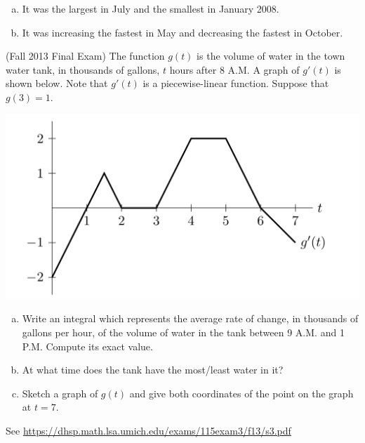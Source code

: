 \documentclass[11pt]{exam}
\begin{document}
\begin{questions}
\begin{solution}
\begin{enumerate}[(a)]
    \item It was the largest in July and the smallest in January 2008.
    \item It was increasing the fastest in May and decreasing the
      fastest in October.
    \end{enumerate}
  \end{solution}
\question (Fall 2013 Final Exam) %
The function $g(t)$ is the volume of water in the town water tank, in thousands of gallons, $t$ hours after 8 A.M. A graph of $g'(t)$ is shown below. Note that $g'(t)$ is a piecewise-linear function. Suppose that $g(3) = 1$.

\begin{minipage}{0.5\linewidth}
  \begin{center}
    \includegraphics[scale=0.4]{Figures/graphg}
  \end{center}
\end{minipage}
\begin{minipage}{0.5\linewidth}
  \begin{enumerate}[(a)]
  \item Write an integral which represents the average rate of change,
    in thousands of gallons per hour, of the volume of water in the
    tank between 9 A.M. and 1 P.M. Compute its exact value.
  \item At what time does the tank have the most/least water in it?
  \item Sketch a graph of $g(t)$ and give both coordinates of the
    point on the graph at $t = 7$.
  \end{enumerate}
\end{minipage}
\begin{solution}
  See \href{https://dhsp.math.lsa.umich.edu/exams/115exam3/f13/s3.pdf}{https://dhsp.math.lsa.umich.edu/exams/115exam3/f13/s3.pdf}
\end{solution}

\end{questions}
\end{document}
